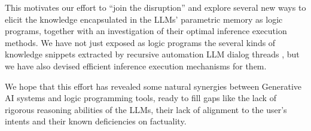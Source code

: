 \documentclass[submission,copyright,creativecommons]{eptcs}
\begin{document}
This motivates our effort to ``join the disruption'' and explore several new
ways to elicit the knowledge encapsulated in the LLMs' parametric memory
as logic programs, together with an investigation of their optimal
inference execution methods. We have not just exposed as logic programs 
the several kinds of
knowledge snippets extracted by recursive automation LLM dialog threads , but we have also devised efficient inference execution mechanisms for them.

We hope that this effort has revealed some natural synergies between  Generative AI systems and logic programming tools, ready to fill  gaps like the lack of rigorous reasoning abilities of the LLMs, their lack of alignment to the user's intents and their known deficiencies on factuality.





\end{document}
